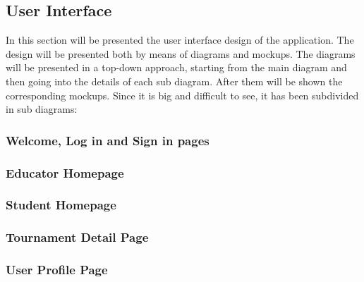 \subsection{User Interface}
In this section will be presented the user interface design of the application. The design will be presented both by means of diagrams and mockups. The diagrams will be presented in a top-down approach, starting from the main diagram and then going into the details of each sub diagram. After them will be shown the corresponding mockups.
Since it is big and difficult to see, it has been subdivided in sub diagrams:
\clearpage
\subsubsection{Welcome, Log in and Sign in pages}
\clearpage
\subsubsection{Educator Homepage}
\clearpage
\subsubsection{Student Homepage}
\clearpage
\subsubsection{Tournament Detail Page}
\clearpage
\subsubsection{User Profile Page}
\clearpage